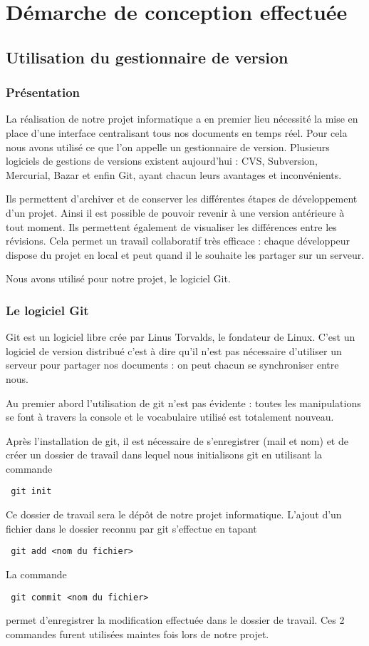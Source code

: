 \chapter{D\'emarche de conception effectu\'ee}
\label{chap:outils utilises}

\section{Utilisation du gestionnaire de version }
\subsection{Pr\'esentation}

La r\'ealisation de notre projet informatique a en premier lieu n\'ecessit\'e la mise en place d'une interface centralisant tous nos
documents en temps r\'eel. Pour cela nous avons utilis\'e ce que l'on appelle un gestionnaire de version. Plusieurs logiciels de gestions 
de versions existent aujourd'hui : CVS, Subversion, Mercurial, Bazar et enfin Git, ayant chacun leurs avantages et inconv\'enients. 

Ils permettent d'archiver et de conserver les diff\'erentes \'etapes de d\'eveloppement d'un projet. Ainsi il est possible de pouvoir revenir
\`a une version ant\'erieure \`a tout moment. Ils permettent \'egalement de visualiser les diff\'erences entre les r\'evisions. Cela permet un  
travail collaboratif tr\`es efficace : chaque d\'eveloppeur dispose du projet en local et peut quand il le souhaite les partager sur un serveur.

Nous avons utilis\'e pour notre projet, le logiciel Git\cite{git}.

\subsection{Le logiciel Git}
Git est un logiciel libre cr\'ee par Linus Torvalds, le fondateur de Linux. C'est un logiciel de version distribu\'e c'est \`a dire qu'il n'est
 pas n\'ecessaire d'utiliser un serveur pour partager nos documents : on peut chacun se synchroniser entre nous.

Au premier abord l'utilisation de git n'est pas \'evidente : toutes les manipulations se font \`a travers la console et le vocabulaire utilis\'e 
est totalement nouveau. 

Apr\`es l'installation de git, il est n\'ecessaire de s'enregistrer (mail et nom) et de cr\'eer un dossier de travail dans lequel nous 
initialisons git en utilisant la commande
\begin{verbatim} git init \end{verbatim}
Ce dossier de travail sera le d\'ep\^ot de notre projet informatique. L'ajout d'un fichier dans le dossier reconnu par git s'effectue en tapant
\begin{verbatim} git add <nom du fichier> \end{verbatim}
La commande
\begin{verbatim} git commit <nom du fichier> \end{verbatim} permet d'enregistrer la modification effectu\'ee dans le dossier de travail.
Ces 2 commandes furent utilis\'ees maintes fois lors de notre projet. 

